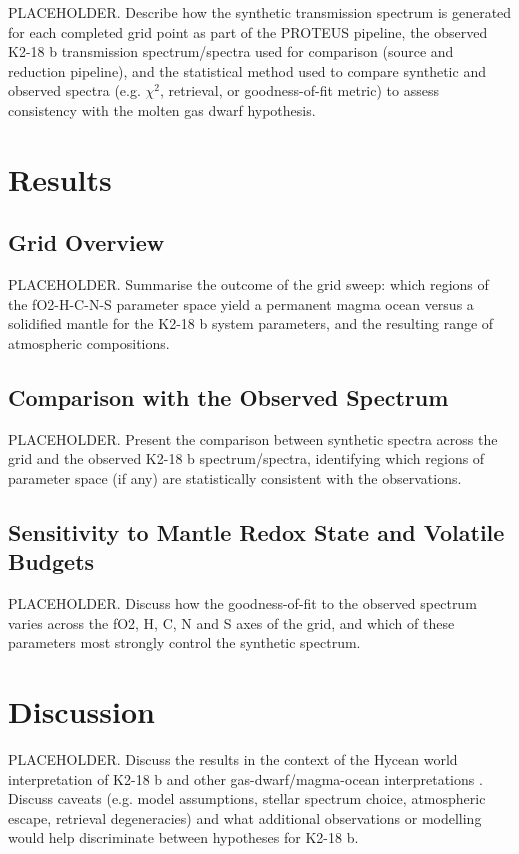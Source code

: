 \documentclass[fleqn,usenatbib]{mnras}
\begin{document}
PLACEHOLDER. Describe how the synthetic transmission spectrum is generated
for each completed grid point as part of the PROTEUS pipeline, the observed
K2-18 b transmission spectrum/spectra used for comparison (source and
reduction pipeline), and the statistical method used to compare synthetic and
observed spectra (e.g. $\chi^2$, retrieval, or goodness-of-fit metric) to
assess consistency with the molten gas dwarf hypothesis.

\section{Results}
\label{sec:results}

\subsection{Grid Overview}
\label{subsec:gridoverview}

PLACEHOLDER. Summarise the outcome of the grid sweep: which regions of the
fO2-H-C-N-S parameter space yield a permanent magma ocean versus a solidified
mantle for the K2-18 b system parameters, and the resulting range of
atmospheric compositions.

\subsection{Comparison with the Observed Spectrum}
\label{subsec:spectrumresults}

PLACEHOLDER. Present the comparison between synthetic spectra across the
grid and the observed K2-18 b spectrum/spectra, identifying which regions of
parameter space (if any) are statistically consistent with the observations.

\subsection{Sensitivity to Mantle Redox State and Volatile Budgets}
\label{subsec:sensitivityresults}

PLACEHOLDER. Discuss how the goodness-of-fit to the observed spectrum varies
across the fO2, H, C, N and S axes of the grid, and which of these parameters
most strongly control the synthetic spectrum.

\section{Discussion}
\label{sec:discussion}

PLACEHOLDER. Discuss the results in the context of the Hycean world
interpretation of K2-18 b \citep{Madhusudhan2021,Madhusudhan2023,Hu2025} and
other gas-dwarf/magma-ocean interpretations
\citep{Shorttle2024,Rigby2024,Wogan2024}. Discuss caveats (e.g. model
assumptions, stellar spectrum choice, atmospheric escape, retrieval
degeneracies) and what additional observations or modelling would help
discriminate between hypotheses for K2-18 b.
\end{document}
